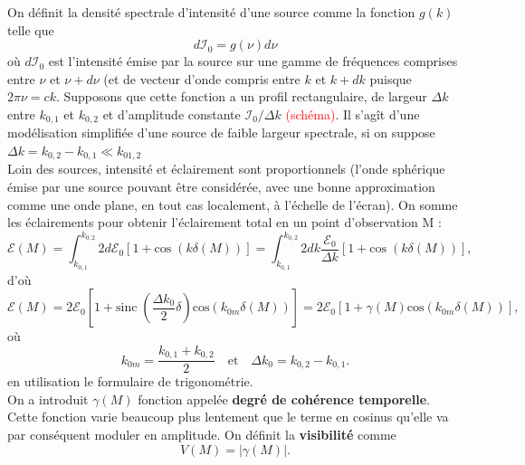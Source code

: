 \documentclass[11pt,a4paper]{report}
\begin{document}
On définit la densité spectrale d'intensité d'une source comme la fonction $g(k)$ telle que
\begin{equation}
	d\mathcal{I}_0 = g(\nu)d\nu
\end{equation}
où $d\mathcal{I}_0$ est l'intensité émise par la source sur une gamme de fréquences comprises entre $\nu$ et $\nu + d\nu$ (et de vecteur d'onde compris entre $k$ et $k+dk$ puisque $2\pi \nu = ck$. Supposons que cette fonction a un profil rectangulaire, de largeur $\Delta k$ entre $k_{0,1}$ et $k_{0,2}$ et d'amplitude constante $\mathcal{I}_0/\Delta k$ \textcolor{red}{(schéma)}. Il s'agît d'une modélisation simplifiée d'une source de faible largeur spectrale, si on suppose  $\Delta k = k_{0,2} - k_{0,1} \ll k_{01,2}$\\

Loin des sources, intensité et éclairement sont proportionnels (l'onde sphérique émise par une source pouvant être considérée, avec une bonne approximation comme une onde plane, en tout cas localement, à l'échelle de l'écran). On somme les éclairements pour obtenir l'éclairement total en un point d'observation M :
\begin{equation}
	\mathcal{E}(M) = \int_{k_{0,1}}^{k_{0,2}} 2d\mathcal{E}_0\left[1 + \text{cos}\;(k\delta(M))\right]
	=  \int_{k_{0,1}}^{k_{0,2}} 2 dk \frac{\mathcal{E}_0}{\Delta k}
	\left[1 + \text{cos}\;(k\delta(M))\right],
\end{equation}
d'où
\begin{equation}
	\boxed{\mathcal{E}(M) = 2\mathcal{E}_0\left[1 + \text{sinc}\;\left(\frac{\Delta k_0}{2}
	\delta\right)\text{cos}\left(k_{0m}\delta(M)\right)\right] 
	= 2\mathcal{E}_0 \left[1 + \gamma(M)\text{cos}\left(k_{0m}\delta(M)\right) \right]},
\end{equation}
où
\begin{equation}
	k_{0m} = \frac{k_{0,1}+k_{0,2}}{2}\quad\text{et}\quad \Delta k_0 = k_{0,2} - k_{0,1}.
\end{equation}
en utilisation le formulaire de trigonométrie.\\

On a introduit $\gamma(M)$ fonction appelée \textbf{degré de cohérence temporelle}. Cette fonction varie beaucoup plus lentement que le terme en cosinus qu'elle va par conséquent moduler en amplitude. On définit la \textbf{visibilité} comme
\begin{equation}
	V(M) = |\gamma(M)|.
\end{equation}
\end{document}
